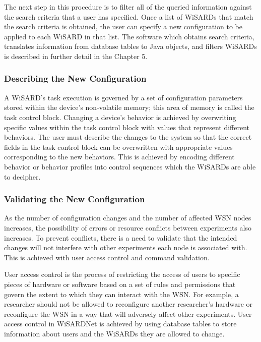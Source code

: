 The next step in this procedure is to filter all of the queried information against the search criteria that a user has specified. Once a list of WiSARDs that match the search criteria is obtained, the user can specify a new configuration to be applied to each WiSARD in that list. The software which obtains search criteria, translates information from  database tables to Java objects, and filters WiSARDs is described in further detail in the Chapter 5.

\subsubsection{Describing the New Configuration}
A WiSARD's task execution is governed by a set of configuration parameters stored within the device's non-volatile memory; this area of memory is called the task control block. Changing a device's behavior is achieved by overwriting specific values within the task control block with values that represent different behaviors. The user must describe the changes to the system so that the correct fields in the task control block can be overwritten with appropriate values corresponding to the new behaviors. This is achieved by encoding different behavior or behavior profiles into control sequences which the WiSARDs are able to decipher. 

\subsubsection{Validating the New Configuration}
As the number of configuration changes and the number of affected WSN nodes increases, the possibility of errors or resource conflicts between experiments also increases. To prevent conflicts, there is a need to validate that the intended changes will not interfere with other experiments each node is associated with. This is achieved with user access control and command validation.

User access control is the process of restricting the access of users to specific pieces of hardware or software based on a set of rules and permissions that govern the extent to which they can interact with the WSN. For example, a researcher should not be allowed to reconfigure another researcher's hardware or reconfigure the WSN in a way that will adversely affect other experiments. User access control in WiSARDNet is achieved by using database tables to store information about users and the WiSARDs they are allowed to change.

